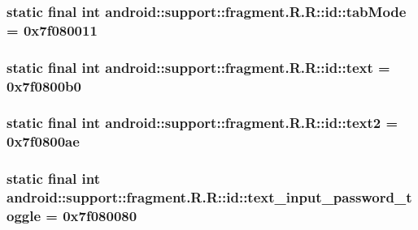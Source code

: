 \hypertarget{classandroid_1_1support_1_1fragment_1_1_r_1_1id_26e84442c7c8784c0d2f727ae189070c}{
\subsubsection[{tabMode}]{\setlength{\rightskip}{0pt plus 5cm}static final int android::support::fragment.R.R::id::tabMode = 0x7f080011}}
\label{classandroid_1_1support_1_1fragment_1_1_r_1_1id_26e84442c7c8784c0d2f727ae189070c}


\hypertarget{classandroid_1_1support_1_1fragment_1_1_r_1_1id_45132115ceeb50991cf352f91eb111dd}{
\subsubsection[{text}]{\setlength{\rightskip}{0pt plus 5cm}static final int android::support::fragment.R.R::id::text = 0x7f0800b0}}
\label{classandroid_1_1support_1_1fragment_1_1_r_1_1id_45132115ceeb50991cf352f91eb111dd}


\hypertarget{classandroid_1_1support_1_1fragment_1_1_r_1_1id_efeb617a3e8a3b28cd13077d5792f660}{
\subsubsection[{text2}]{\setlength{\rightskip}{0pt plus 5cm}static final int android::support::fragment.R.R::id::text2 = 0x7f0800ae}}
\label{classandroid_1_1support_1_1fragment_1_1_r_1_1id_efeb617a3e8a3b28cd13077d5792f660}


\hypertarget{classandroid_1_1support_1_1fragment_1_1_r_1_1id_1e22d7da7e72ecc715d4bbc3eba30dfa}{
\subsubsection[{text\_\-input\_\-password\_\-toggle}]{\setlength{\rightskip}{0pt plus 5cm}static final int android::support::fragment.R.R::id::text\_\-input\_\-password\_\-toggle = 0x7f080080}}
\label{classandroid_1_1support_1_1fragment_1_1_r_1_1id_1e22d7da7e72ecc715d4bbc3eba30dfa}


